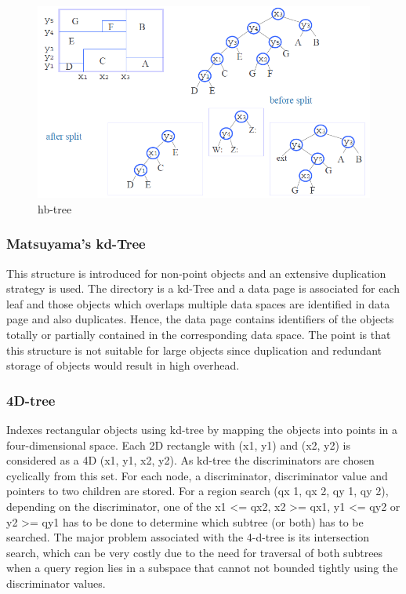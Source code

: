 \documentclass[a4paper,12pt]{article}
\begin{document}
\begin{figure}
\centering
\includegraphics[width=\textwidth]{hbtree}
\caption{hb-tree}
\label{fig1}
\end{figure}

\subsubsection{Matsuyama’s kd-Tree}
This structure is introduced for non-point objects and an extensive duplication strategy is used. The directory is a kd-Tree and a data page is associated for each leaf and those objects which overlaps multiple data spaces are identified in data page and also duplicates. Hence, the data page contains identifiers of the objects totally or partially contained in the corresponding data space.
The point is that this structure is not suitable for large objects since duplication and redundant storage of objects would result in high overhead.

\subsubsection{4D-tree}
Indexes rectangular objects using kd-tree by mapping the objects into points in a four-dimensional space. Each 2D rectangle with (x1, y1) and (x2, y2) is considered as a 4D (x1, y1, x2, y2). As kd-tree the discriminators are chosen cyclically from this set. For each node, a discriminator, discriminator value and pointers to two children are stored. 
For a region search (qx 1, qx 2, qy 1, qy 2), depending on the discriminator, one of the x1 <= qx2, x2  >=  qx1, y1 <= qy2 or y2 >= qy1 has to be done to determine which subtree (or both) has to be searched.
The major problem associated with the 4-d-tree is its intersection search, which can be very costly due to the need for traversal of both subtrees when a query region lies in a subspace that cannot not bounded tightly using the discriminator values.
\end{document}

